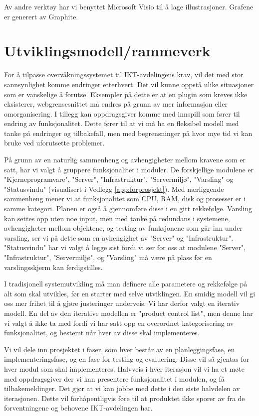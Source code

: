Av andre verktøy har vi benyttet Microsoft Visio til å lage illustrasjoner. Grafene er generert av Graphite.

\section{Utviklingsmodell/rammeverk}
For å tilpasse overvåkningssystemet til IKT-avdelingens krav, vil det med stor sannsynlighet komme endringer etterhvert. Det vil kunne oppstå ulike situasjoner som er vanskelige å forutse. Eksempler på dette er at en plugin som kreves ikke eksisterer, webgrensesnittet må endres på grunn av mer informasjon eller omorganisering. I tillegg kan oppdragsgiver komme med innspill som fører til endring av funksjonalitet. Dette fører til at vi må ha en fleksibel modell med tanke på endringer og tilbakefall, men med begrensninger på hvor mye tid vi kan bruke ved uforutsette problemer.

På grunn av en naturlig sammenheng og avhengigheter mellom kravene som er satt, har vi valgt å gruppere funksjonalitet i moduler. De forskjellige modulene er "Kjerneprogramvare", "Server", "Infrastruktur", "Servermiljø", "Varsling" og "Statusvindu" (visualisert i Vedlegg \ref{app:forprosjekt}). Med nærliggende sammenheng mener vi at funksjonalitet som CPU, RAM, disk og prosesser er i samme kategori. Planen er også å gjennomføre disse i en gitt rekkefølge. Varsling kan settes opp uten noe input, men med tanke på redundans i systemene, avhengigheter mellom objektene, og testing av funksjonene som går inn under varsling, ser vi på dette som en avhengighet av "Server" og "Infrastruktur". "Statusvindu" har vi valgt å legge sist fordi vi ser for oss at modulene "Server", "Infrastruktur", "Servermiljø", og "Varsling" må være på plass før en varslingsskjerm kan ferdigstilles.

I tradisjonell systemutvikling må man definere alle parametere og rekkefølge på alt som skal utvikles, før en starter med selve utviklingen. En smidig modell vil gi oss mer frihet til å gjøre justeringer underveis. Vi har derfor valgt en iterativ modell\cite{wiki:iterativ}. En del av den iterative modellen er "product control list", men denne har vi valgt å ikke ta med fordi vi har satt opp en overordnet kategorisering av funksjonalitet, og bestemt når hver av disse skal implementeres.

Vi vil dele inn prosjektet i faser, som hver består av en planleggingsfase, en implementeringsfase, og en fase for testing og evaluering. Disse vil så gjentas for hver modul som skal implementeres. Halvveis i hver iterasjon vil vi ha et møte med oppdragsgiver der vi kan presentere funksjonalitet i modulen, og få tilbakemeldinger. Det gjør at vi kan jobbe med dette i den siste halvdelen av iterasjonen. Dette vil forhåpentligvis føre til at produktet ikke sporer av fra de forventningene og behovene IKT-avdelingen har.

